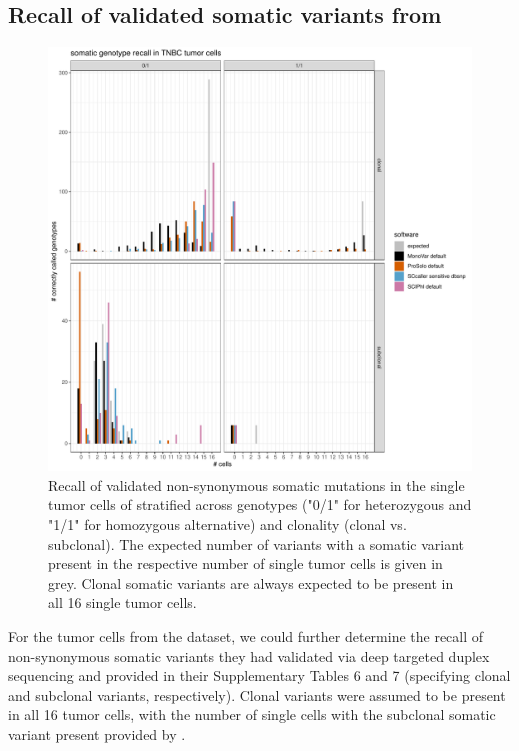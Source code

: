 \documentclass[authoryear,preprint,11pt]{scrartcl}
\begin{document}
\subsection{Recall of validated somatic variants from \cite{wang_clonal_2014}} \label{sec:somatic-recall}

\begin{figure}[!tpb]
  \includegraphics[width=\linewidth]{figs/Wang2014/Wang2014_validated_somatic_genotype_recall.pdf}
 \caption{
 Recall of validated non-synonymous somatic mutations in the single tumor cells of \cite{wang_clonal_2014} stratified across genotypes ("0/1" for heterozygous and "1/1" for homozygous alternative) and clonality (clonal vs. subclonal).
 The expected number of variants with a somatic variant present in the respective number of single tumor cells is given in grey.
 Clonal somatic variants are always expected to be present in all 16 single tumor cells.
 }
 \label{fig:somatic-recall}
\end{figure}
For the tumor cells from the \cite{wang_clonal_2014} dataset, we could further determine the recall of non-synonymous somatic variants they had validated via deep targeted duplex sequencing and provided in their Supplementary Tables 6 and 7 (specifying clonal and subclonal variants, respectively).
Clonal variants were assumed to be present in all 16 tumor cells, with the number of single cells with the subclonal somatic variant present provided by \cite{wang_clonal_2014}.
\end{document}
